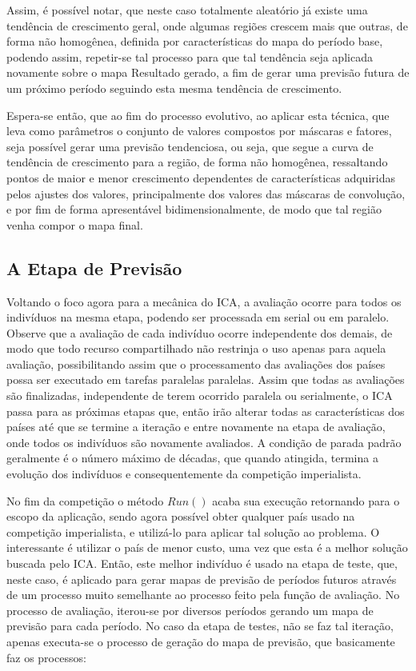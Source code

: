 Assim, é possível notar, que neste caso totalmente aleatório já existe uma tendência de crescimento geral, onde algumas regiões crescem mais que outras, de forma não homogênea, definida por características do mapa do período base, podendo assim, repetir-se tal processo para que tal tendência seja aplicada novamente sobre o mapa Resultado gerado, a fim de gerar uma previsão futura de um próximo período seguindo esta mesma tendência de crescimento. 

Espera-se então, que ao fim do processo evolutivo, ao aplicar esta técnica, que leva como parâmetros o conjunto de valores compostos por máscaras e fatores, seja possível gerar uma previsão tendenciosa, ou seja, que segue a curva de tendência de crescimento para a região, de forma não homogênea, ressaltando pontos de maior e menor crescimento dependentes de características adquiridas pelos ajustes dos valores, principalmente dos valores das máscaras de convolução, e por fim de forma apresentável bidimensionalmente, de modo que tal região venha compor o mapa final. 

\subsection{A Etapa de Previsão}
\label{A Etapa de Previsão}

Voltando o foco agora para a mecânica do ICA, a avaliação ocorre para todos os indivíduos na mesma etapa, podendo ser processada em serial ou em paralelo. Observe que a avaliação de cada indivíduo ocorre independente dos demais, de modo que todo recurso compartilhado não restrinja o uso apenas para aquela avaliação, possibilitando assim que o processamento das avaliações dos países possa ser executado em tarefas paralelas paralelas. Assim que todas as avaliações são finalizadas, independente de terem ocorrido paralela ou serialmente, o ICA passa para as próximas etapas que, então irão alterar todas as características dos países até que se termine a iteração e entre novamente na etapa de avaliação, onde todos os indivíduos são novamente avaliados. A condição de parada padrão geralmente é o número máximo de décadas, que quando atingida, termina a evolução dos indivíduos e consequentemente da competição imperialista. 

No fim da competição o método \(Run()\) acaba sua execução retornando para o escopo da aplicação, sendo agora possível obter qualquer país usado na competição imperialista, e utilizá-lo para aplicar tal solução ao problema. O interessante é utilizar o país de menor custo, uma vez que esta é a melhor solução buscada pelo ICA. Então, este melhor indivíduo é usado na etapa de teste, que, neste caso, é aplicado para gerar mapas de previsão de períodos futuros através de um processo muito semelhante ao processo feito pela função de avaliação. No processo de avaliação, iterou-se por diversos períodos gerando um mapa de previsão para cada período. No caso da etapa de testes, não se faz tal iteração, apenas executa-se o processo de geração do mapa de previsão, que basicamente faz os processos:

